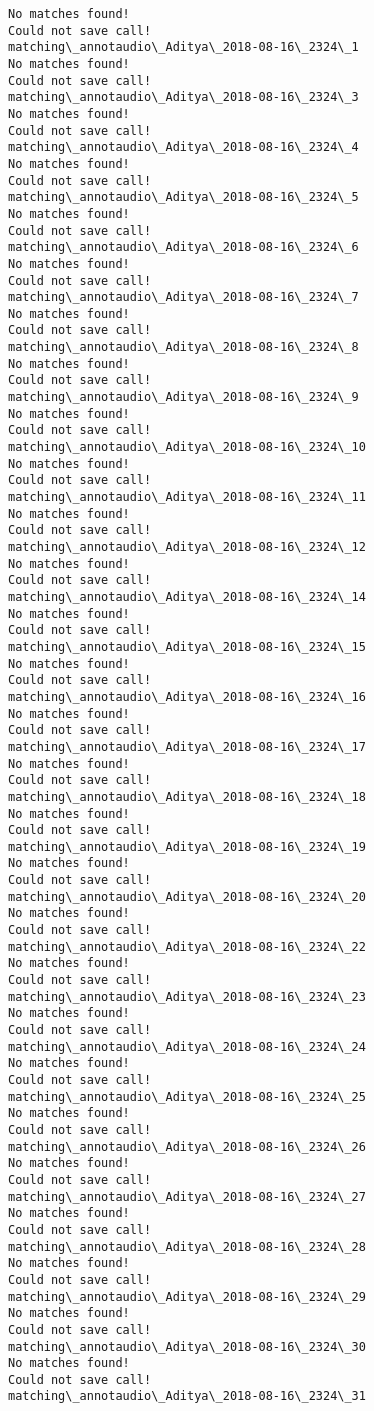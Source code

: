 \documentclass[11pt]{article}
\begin{document}
    \begin{Verbatim}[commandchars=\\\{\}]
No matches found!
Could not save call!
matching\_annotaudio\_Aditya\_2018-08-16\_2324\_1
No matches found!
Could not save call!
matching\_annotaudio\_Aditya\_2018-08-16\_2324\_3
No matches found!
Could not save call!
matching\_annotaudio\_Aditya\_2018-08-16\_2324\_4
No matches found!
Could not save call!
matching\_annotaudio\_Aditya\_2018-08-16\_2324\_5
No matches found!
Could not save call!
matching\_annotaudio\_Aditya\_2018-08-16\_2324\_6
No matches found!
Could not save call!
matching\_annotaudio\_Aditya\_2018-08-16\_2324\_7
No matches found!
Could not save call!
matching\_annotaudio\_Aditya\_2018-08-16\_2324\_8
No matches found!
Could not save call!
matching\_annotaudio\_Aditya\_2018-08-16\_2324\_9
No matches found!
Could not save call!
matching\_annotaudio\_Aditya\_2018-08-16\_2324\_10
No matches found!
Could not save call!
matching\_annotaudio\_Aditya\_2018-08-16\_2324\_11
No matches found!
Could not save call!
matching\_annotaudio\_Aditya\_2018-08-16\_2324\_12
No matches found!
Could not save call!
matching\_annotaudio\_Aditya\_2018-08-16\_2324\_14
No matches found!
Could not save call!
matching\_annotaudio\_Aditya\_2018-08-16\_2324\_15
No matches found!
Could not save call!
matching\_annotaudio\_Aditya\_2018-08-16\_2324\_16
No matches found!
Could not save call!
matching\_annotaudio\_Aditya\_2018-08-16\_2324\_17
No matches found!
Could not save call!
matching\_annotaudio\_Aditya\_2018-08-16\_2324\_18
No matches found!
Could not save call!
matching\_annotaudio\_Aditya\_2018-08-16\_2324\_19
No matches found!
Could not save call!
matching\_annotaudio\_Aditya\_2018-08-16\_2324\_20
No matches found!
Could not save call!
matching\_annotaudio\_Aditya\_2018-08-16\_2324\_22
No matches found!
Could not save call!
matching\_annotaudio\_Aditya\_2018-08-16\_2324\_23
No matches found!
Could not save call!
matching\_annotaudio\_Aditya\_2018-08-16\_2324\_24
No matches found!
Could not save call!
matching\_annotaudio\_Aditya\_2018-08-16\_2324\_25
No matches found!
Could not save call!
matching\_annotaudio\_Aditya\_2018-08-16\_2324\_26
No matches found!
Could not save call!
matching\_annotaudio\_Aditya\_2018-08-16\_2324\_27
No matches found!
Could not save call!
matching\_annotaudio\_Aditya\_2018-08-16\_2324\_28
No matches found!
Could not save call!
matching\_annotaudio\_Aditya\_2018-08-16\_2324\_29
No matches found!
Could not save call!
matching\_annotaudio\_Aditya\_2018-08-16\_2324\_30
No matches found!
Could not save call!
matching\_annotaudio\_Aditya\_2018-08-16\_2324\_31

\end{Verbatim}
\end{document}
